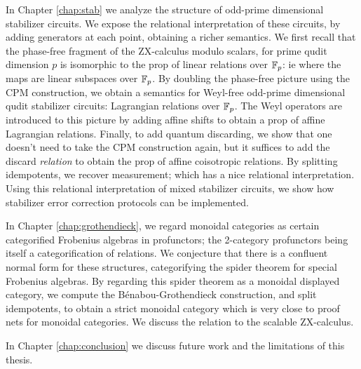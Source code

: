 \documentclass[12pt]{ociamthesis}  %
\begin{document}
In Chapter \ref{chap:stab}  we analyze the structure of odd-prime dimensional stabilizer circuits.
We expose the relational interpretation of these circuits, by adding generators at each point, obtaining a richer semantics.  We first recall that the phase-free fragment of the ZX-calculus modulo scalars, for prime qudit dimension $p$ is isomorphic to the prop of linear relations over $\mathbb{F}_p$: ie where the maps are linear subspaces over $\mathbb{F}_p$.  By doubling the phase-free picture using the CPM construction, we obtain a semantics for Weyl-free odd-prime dimensional qudit stabilizer circuits: Lagrangian relations over $\mathbb{F}_p$.  The Weyl operators are introduced to this picture by adding affine shifts to obtain a prop of affine Lagrangian relations.  Finally, to add quantum discarding, we show that one doesn't need to take the CPM construction again, but it suffices to add the discard {\em relation} to obtain the prop of affine coisotropic relations.  By splitting idempotents, we recover measurement; which has a nice relational interpretation.  Using this relational interpretation of mixed stabilizer circuits, we show how stabilizer error correction protocols can be implemented.


In Chapter \ref{chap:grothendieck}, we regard monoidal categories as certain categorified Frobenius algebras in profunctors; the 2-category profunctors being itself a categorification of relations.  We conjecture that there is a confluent normal form for these structures, categorifying the spider theorem for special Frobenius algebras.  By regarding this spider theorem as a monoidal displayed category, we compute the B\'enabou-Grothendieck construction, and split idempotents, to obtain a strict monoidal category which is very close to proof nets for monoidal categories. We discuss the relation to the scalable ZX-calculus.

In Chapter \ref{chap:conclusion} we discuss future work and the limitations of this thesis.
\end{document}

